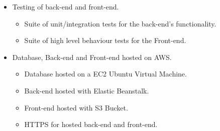 \begin{itemize}
\begin{itemize}
    \end{itemize}
    \item Testing of back-end and front-end. \checkmark
    \begin{itemize}
        \item Suite of unit/integration tests for the back-end's functionality. \checkmark 
        \item Suite of high level behaviour tests for the Front-end. \checkmark 
    \end{itemize}
    \item Database, Back-end and Front-end hosted on AWS. \checkmark 
    \begin{itemize} 
        \item Database hosted on a EC2 Ubuntu Virtual Machine. \checkmark 
        \item Back-end hosted with Elastic Beanstalk. \checkmark 
        \item Front-end hosted with S3 Bucket. \checkmark 
        \item HTTPS for hosted back-end and front-end. \checkmark 
    \end{itemize}
\end{itemize}